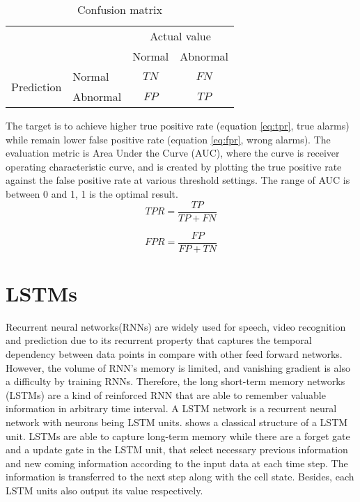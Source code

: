 \begin{table}[h]
\begin{center}
\begin{tabular}{l|l|c|c|}
\multicolumn{2}{c}{}&\multicolumn{2}{c}{Actual value}\\
\cline{3-4}
\multicolumn{2}{c|}{}&Normal&Abnormal\\
\cline{2-4}
\multirow{2}{*}{Prediction}& Normal & $TN$ & $FN$\\
\cline{2-4}
& Abnormal & $FP$ & $TP$\\
\cline{2-4}
\end{tabular}
\end{center}
\label{tab:conf}
\caption{Confusion matrix}
\end{table}

The target is to achieve higher true positive rate (equation \ref{eq:tpr}, true alarms) while remain lower false positive rate (equation \ref{eq:fpr}, wrong alarms). The evaluation metric is Area Under the Curve (AUC), where the curve is receiver operating characteristic curve, and is created by plotting the true positive rate against the false positive rate at various threshold settings. The range of AUC is between 0 and 1, 1 is the optimal result.\\
\begin{equation} \label{eq:tpr}
TPR =\dfrac{TP}{TP+FN}
\end{equation}

\begin{equation} \label{eq:fpr}
FPR = \dfrac{FP}{FP+TN}
\end{equation}



\section{LSTMs}
\label{sec:LSTMs}

Recurrent neural networks(RNNs) are widely used for speech, video recognition and prediction due to its recurrent property that captures the temporal dependency between data points in compare with other feed forward networks. However, the volume of RNN’s memory is limited, and vanishing gradient is also a difficulty by training RNNs. Therefore, the long short-term memory networks (LSTMs) are a kind of reinforced RNN that are able to remember valuable information in arbitrary time interval. A LSTM network is a recurrent neural network with neurons being LSTM units.  shows a classical structure of a LSTM unit. LSTMs are able to capture long-term memory while there are a forget gate and a update gate in the LSTM unit, that select necessary previous information and new coming information according to the input data at each time step. The information is transferred to the next step along with the cell state. Besides, each LSTM units also output its value respectively.\\

